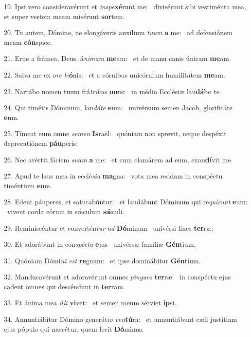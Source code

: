 19. Ipsi vero consideravérunt et \textit{in}\textit{spe}\textbf{xé}runt me: \ast\  divisérunt sibi vestiménta mea, et super vestem meam misérunt \textbf{sor}tem.\

20. Tu autem, Dómine, ne elongáveris auxílium \textit{tu}\textit{um} \textbf{a} me: \ast\  ad defensiónem meam \textbf{cón}spice.\

21. Erue a frámea, Deus, á\textit{ni}\textit{mam} \textbf{me}am: \ast\  et de manu canis únicam \textbf{me}am.\

22. Salva me ex o\textit{re} \textit{le}\textbf{ó}nis: \ast\  et a córnibus unicórnium humilitátem \textbf{me}am.\

23. Narrábo nomen tuum frá\textit{tri}\textit{bus} \textbf{me}is: \ast\  in médio Ecclésiæ lau\textbf{dá}bo te.\

24. Qui timétis Dóminum, lau\textit{dá}\textit{te} \textbf{e}um: \ast\  univérsum semen Jacob, glorificáte \textbf{e}um.\

25. Tímeat eum omne \textit{se}\textit{men} \textbf{Is}raël: \ast\  quóniam non sprevit, neque despéxit deprecatiónem \textbf{páu}peris:\

26. Nec avértit fáciem \textit{su}\textit{am} \textbf{a} me: \ast\  et cum clamárem ad eum, exau\textbf{dí}vit me.\

27. Apud te laus mea in ecclé\textit{si}\textit{a} \textbf{ma}gna: \ast\  vota mea reddam in conspéctu timéntium \textbf{e}um.\

28. Edent páuperes, et saturabúntur: \dag\  et laudábunt Dóminum qui re\textit{quí}\textit{runt} \textbf{e}um: \ast\  vivent corda eórum in sǽculum \textbf{sǽ}culi.\

29. Reminiscéntur et convertén\textit{tur} \textit{ad} \textbf{Dó}minum \ast\  univérsi fines \textbf{ter}ræ:\

30. Et adorábunt in con\textit{spéc}\textit{tu} \textbf{e}jus \ast\  univérsæ famíliæ \textbf{Gén}tium.\

31. Quóniam Dómi\textit{ni} \textit{est} \textbf{re}gnum: \ast\  et ipse dominábitur \textbf{Gén}tium.\

32. Manducavérunt et adoravérunt omnes \textit{pin}\textit{gues} \textbf{ter}ræ: \ast\  in conspéctu ejus cadent omnes qui descéndunt in \textbf{ter}ram.\

33. Et ánima mea \textit{il}\textit{li} \textbf{vi}vet: \ast\  et semen meum sérviet \textbf{ip}si.\

34. Annuntiábitur Dómino generáti\textit{o} \textit{ven}\textbf{tú}ra: \ast\  et annuntiábunt cæli justítiam ejus pópulo qui nascétur, quem fecit \textbf{Dó}minus.\

